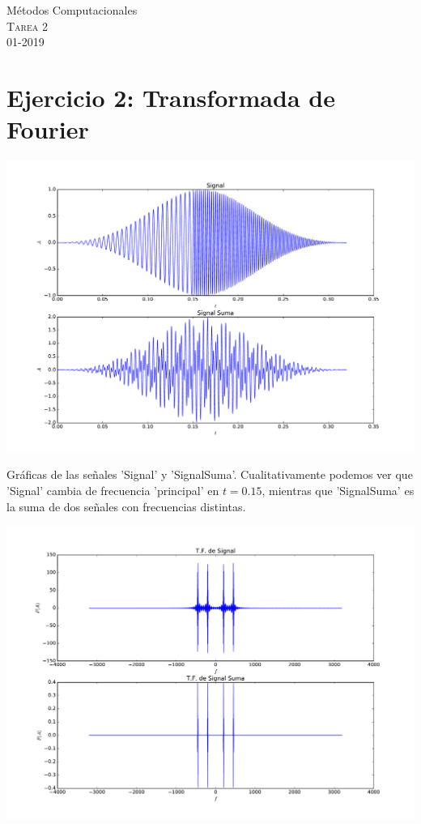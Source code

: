 \documentclass[11pt,letterpaper]{exam}
\begin{document}
\begin{center}
{\Large Métodos Computacionales} \\
\textsc{Tarea 2}\\
01-2019\\
\end{center}

\noindent
\section{Ejercicio 2: Transformada de Fourier}
\begin{center}
\includegraphics[width=14cm]{2_Signal.pdf} 
\end{center}
{Gráficas de las señales 'Signal' y 'SignalSuma'. Cualitativamente podemos ver que 'Signal' cambia de frecuencia 'principal' en $t=0.15$, mientras que 'SignalSuma' es la suma de dos señales con frecuencias distintas. } 
\begin{center}
\includegraphics[width=14cm]{2_FourierSignal.pdf} 
\end{center}
\end{document}
